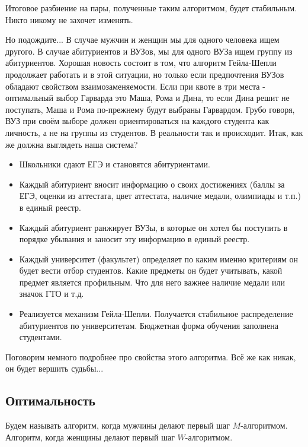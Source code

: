 \documentclass[pdftex, 12pt, a4paper]{article}
\begin{document}
Итоговое разбиение на пары, полученные таким алгоритмом, будет стабильным. Никто никому не захочет изменять. 

Но подождите... В случае мужчин и женщин мы для одного человека ищем другого. В случае абитуриентов и ВУЗов, мы для одного ВУЗа ищем группу из абитуриентов. Хорошая новость состоит в том, что алгоритм Гейла-Шепли продолжает работать и в этой ситуации, но только если предпочтения ВУЗов обладают свойством взаимозаменяемости. Если при квоте в три места - оптимальный выбор Гарварда это Маша, Рома и Дина, то если Дина решит не поступать, Маша и Рома по-прежнему будут выбраны Гарвардом.  Грубо говоря, ВУЗ при своём выборе должен ориентироваться на каждого студента как личность, а не на группы из студентов. В реальности так и происходит. Итак, как же должна выглядеть наша система? 

\begin{itemize}
\item Школьники сдают ЕГЭ и становятся абитуриентами. 

\item Каждый абитуриент вносит информацию о своих достижениях (баллы за ЕГЭ, оценки из аттестата, цвет аттестата, наличие медали, олимпиады и т.п.) в единый реестр. 

\item Каждый абитуриент ранжирует ВУЗы, в которые он хотел бы поступить в порядке убывания и заносит эту информацию в единый реестр.

\item Каждый университет (факультет) определяет по каким именно критериям он будет вести отбор студентов. Какие предметы он будет учитывать, какой предмет является профильным. Что для него важнее наличие медали или значок ГТО и т.д. 

\item Реализуется механизм Гейла-Шепли. Получается стабильное распределение абитуриентов по университетам. Бюджетная форма обучения заполнена студентами. 
\end{itemize}

Поговорим немного подробнее про свойства этого алгоритма. Всё же как никак, он будет вершить судьбы... 

\subsection*{Оптимальность}

Будем называть алгоритм, когда мужчины делают первый шаг $M$-алгоритмом. Алгоритм, когда женщины делают первый шаг $W$-алгоритмом. 
\end{document}
